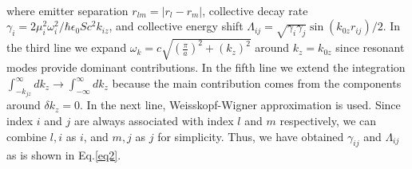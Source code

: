\documentclass[aps,showpacs,twocolumn,twoside,groupedaddress]{revtex4}
\begin{document}
\begin{widetext}
\begin{equation}
\begin{split}
\end{split}
\end{equation}
where emitter separation $r_{lm}=|r_{l}-r_{m}|$, collective decay rate $\gamma_{i}=2\mu_{i}^{2}\omega_{i}^{2}/\hbar\epsilon_{0}Sc^{2}k_{iz}$, and collective energy shift $\Lambda_{ij}=\sqrt{\gamma_{i}\gamma_{j}}\sin(k_{0z}r_{ij})/2$.
In the third line we expand $\omega_{k}=c\sqrt{(\frac{\pi}{a})^{2}+(k_{z})^{2}}$ around $k_{z}=k_{0z}$ since resonant modes provide dominant contributions. In the fifth line we extend the integration $\int_{-k_{jz}}^{\infty}dk_{z}\rightarrow\int_{-\infty}^{\infty}dk_{z}$ because the main contribution comes from the components around $\delta k_{z}=0$. In the next line, Weisskopf-Wigner approximation is used. Since index $i$ and $j$ are always associated with index $l$ and $m$ respectively, we can combine $l,i$ as $i$, and $m,j$ as $j$ for simplicity. Thus, we have obtained $\gamma_{ij}$ and $\Lambda_{ij}$ as is shown in Eq.\eqref{eq2}. 


\end{widetext}
\end{document}
